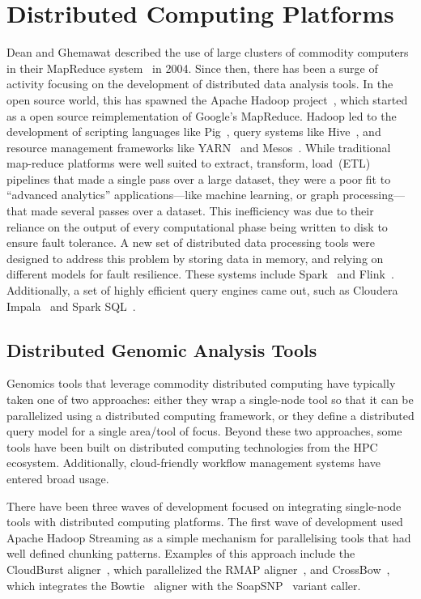 \documentclass[phd]{ucbthesis}
\begin{document}
\section{Distributed Computing Platforms}
\label{sec:distributed-computing}

Dean and Ghemawat described the use of large clusters of commodity computers in their
{MapReduce} system~\cite{dean04, dean08} in 2004. Since then, there has
been a surge of activity focusing on the development of distributed data
analysis tools. In the open source world, this has spawned the {Apache
  Hadoop} project~\cite{hadoop}, which started as a open source reimplementation
of Google's {MapReduce}. {Hadoop} led to the development of
scripting languages like {Pig}~\cite{olston08}, query systems like
{Hive}~\cite{thusoo09}, and resource management frameworks like
{YARN}~\cite{vavilapalli13} and {Mesos}~\cite{hindman11}. While
traditional map-reduce platforms were well suited to extract, transform,
load~(ETL) pipelines that made a single pass over a large dataset, they were
a poor fit to ``advanced analytics'' applications---like machine learning, or
graph processing---that made several passes over a dataset. This inefficiency was due to
their reliance on the output of every computational phase being written to
disk to ensure fault tolerance. A new set of distributed data processing tools
were designed to address this problem by storing data in memory, and relying
on different models for fault resilience. These systems include
{Spark}~\cite{zaharia10, zaharia12} and {Flink}~\cite{carbone15}.
Additionally, a set of highly efficient query engines came out, such as
{Cloudera Impala}~\cite{kornacker15} and {Spark
  SQL}~\cite{armbrust15}.

\subsection{Distributed Genomic Analysis Tools}
\label{sec:distributed-genome-analysis}

Genomics tools that leverage commodity distributed computing have typically
taken one of two approaches: either they wrap a single-node tool so that it can
be parallelized using a distributed computing framework, or they define a
distributed query model for a single area/tool of focus. Beyond these two
approaches, some tools have been built on distributed computing technologies
from the HPC ecosystem. Additionally, cloud-friendly workflow management
systems have entered broad usage.

There have been three waves of development focused on integrating single-node
tools with distributed computing platforms. The first wave of development used
{Apache Hadoop Streaming} as a simple mechanism for parallelising tools
that had well defined chunking patterns. Examples of this approach include the
{CloudBurst} aligner~\cite{schatz09}, which parallelized the
{RMAP} aligner~\cite{smith08}, and
{CrossBow}~\cite{langmead09crossbow}, which integrates the
{Bowtie}~\cite{langmead09bowtie} aligner with the
{SoapSNP}~\cite{li09snp} variant caller.
\end{document}
